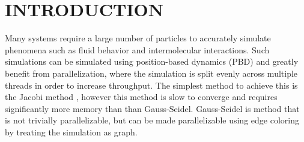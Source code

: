 %
%
%



\chapter{INTRODUCTION}


\indent \indent 
Many systems require a large number of particles to accurately simulate phenomena such as fluid behavior and intermolecular interactions. Such simulations can be simulated using position-based dynamics (PBD) and greatly benefit from parallelization, where the simulation is split evenly across multiple threads in order to increase throughput. The simplest method to achieve this is the Jacobi method \cite{bojun}, however this method is slow to converge and requires significantly more memory than than Gauss-Seidel. Gauss-Seidel is method that is not trivially parallelizable, but can be made parallelizable using edge coloring by treating the simulation as graph.

\vspace{-0.4em} %

